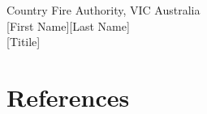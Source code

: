 \documentclass[13pt]{ctexart} %
\begin{document}
\thispagestyle{empty}
\vspace{10pt}
\begin{flushleft}
    Country Fire Authority, VIC Australia\\
    {[First Name][Last Name]}\\
    {[Titile]}
\end{flushleft}

\newpage
\section*{References}
\fancyhf{}
\fancyhead[R]{ }
\fancyhead[L]{ }

\Large

\end{document}
